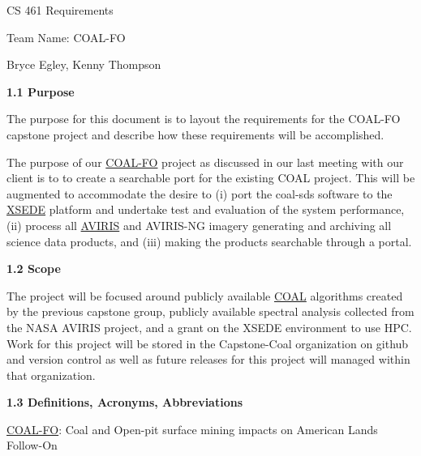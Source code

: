 \documentclass[a4paper,12pt]{article}
\begin{document}
\sloppy

\noindent CS 461 Requirements\newline


\noindent Team Name: COAL-FO\newline


\noindent Bryce Egley, Kenny Thompson\newline


\newline


\noindent \textbf{1.1 Purpose}\newline


\noindent The purpose for this document is to layout the requirements for the COAL-FO capstone project and describe how these requirements will be accomplished. \newline

\noindent The purpose of our \href{http://eecs.oregonstate.edu/capstone/submission/?page=preview\&pid=320}{COAL-FO} project as discussed in our last meeting with our client is to to create a searchable port for the existing COAL project. This will be augmented to accommodate the desire to (i) port the coal-sds software to the \href{https://www.xsede.org/}{XSEDE} platform and undertake test and evaluation of the system performance, (ii) process all \href{https://aviris.jpl.nasa.gov/}{AVIRIS} and AVIRIS-NG imagery generating and archiving all science data products, and (iii) making the products searchable through a portal. \newline

\noindent \textbf{1.2 Scope}\newline


\noindent The project will be focused around publicly available \href{https://capstone-coal.github.io/}{COAL} algorithms created by the previous capstone group, publicly available spectral analysis collected from the NASA AVIRIS project, and a grant on the XSEDE environment to use HPC. Work for this project will be stored in the Capstone-Coal organization on github and version control as well as future releases for this project will managed within that organization.\newline


\noindent \textbf{1.3 Definitions, Acronyms, Abbreviations}\newline


\noindent \href{http://eecs.oregonstate.edu/capstone/submission/?page=preview\&pid=320}{COAL-FO}: Coal and Open-pit surface mining impacts on American Lands Follow-On\newline
\end{document}
